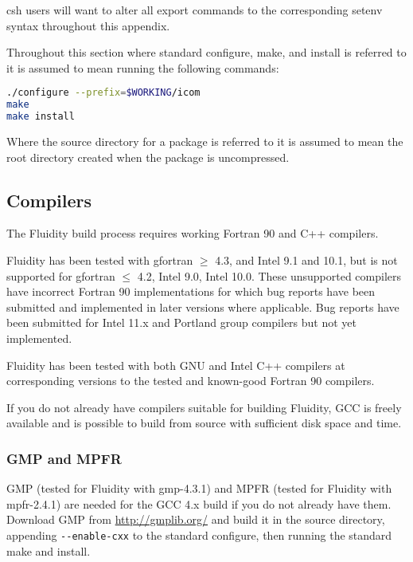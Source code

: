 csh users will want to alter all export commands to the corresponding setenv
syntax throughout this appendix.

Throughout this section where standard configure, make, and install is referred
to it is assumed to mean running the following commands:

\begin{lstlisting}[language=bash]
./configure --prefix=$WORKING/icom
make
make install
\end{lstlisting}

Where the source directory for a package is referred to it is assumed to mean
the root directory created when the package is uncompressed.

\subsection{Compilers}
\label{sect:required_libraries_compilers}

The Fluidity build process requires working Fortran 90 and C++ compilers.

Fluidity has been tested with gfortran $\geq$ 4.3, and Intel 9.1 and 10.1, but
is not supported for gfortran $\leq$ 4.2, Intel 9.0, Intel 10.0. These
unsupported compilers have incorrect Fortran 90 implementations for which bug
reports have been submitted and implemented in later versions where applicable.
Bug reports have been submitted for Intel 11.x and Portland group compilers but
not yet implemented.

Fluidity has been tested with both GNU and Intel C++ compilers at corresponding
versions to the tested and known-good Fortran 90 compilers.

If you do not already have compilers suitable for building Fluidity, GCC is
freely available and is possible to build from source with sufficient disk
space and time.

\subsubsection{GMP and MPFR}
\label{sect:required_libraries_compilers_gmp_mpfr}

GMP (tested for Fluidity with gmp-4.3.1) and MPFR (tested for Fluidity with
mpfr-2.4.1) are needed for the GCC 4.x build if you do not already have them.
Download GMP from \url{http://gmplib.org/} and build it in the source
directory, appending \lstinline[language=bash]+--enable-cxx+ to the standard
configure, then running the standard make and install.

